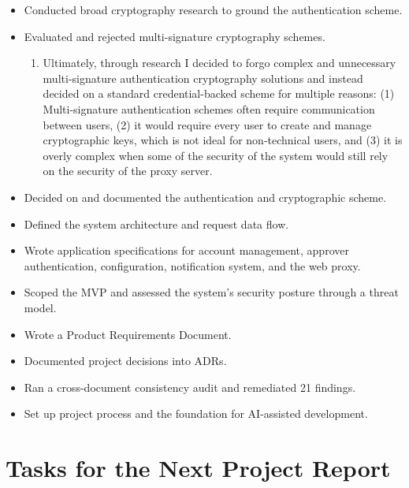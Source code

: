 \documentclass[12pt]{article}
\begin{document}
\begin{itemize}[leftmargin=1.5em, itemsep=2pt]
  \item Conducted broad cryptography research to ground the authentication scheme.
  \item Evaluated and rejected multi-signature cryptography schemes.
  \begin{enumerate}
    \item Ultimately, through research I decided to forgo complex and unnecessary multi-signature authentication cryptography solutions and instead decided on a standard credential-backed scheme for multiple reasons: (1) Multi-signature authentication schemes often require communication between users, (2) it would require every user to create and manage cryptographic keys, which is not ideal for non-technical users, and (3) it is overly complex when some of the security of the system would still rely on the security of the proxy server.
  \end{enumerate}
  \item Decided on and documented the authentication and cryptographic scheme.
  \item Defined the system architecture and request data flow.
  \item Wrote application specifications for account management, approver authentication, configuration, notification system, and the web proxy.
  \item Scoped the MVP and assessed the system's security posture through a threat model.
  \item Wrote a Product Requirements Document.
  \item Documented project decisions into ADRs.
  \item Ran a cross-document consistency audit and remediated 21 findings.
  \item Set up project process and the foundation for AI-assisted development.
\end{itemize}

\section*{Tasks for the Next Project Report}
\end{document}
